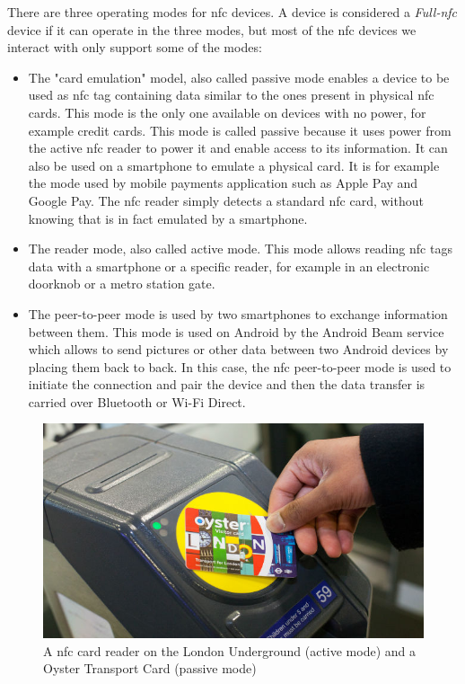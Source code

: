 \documentclass[twoside, openright,11pt,a4paper]{book}
\begin{document}
There are three operating modes for \gls{nfc} devices. A device is considered a \emph{Full-\gls{nfc}} device if it can operate in the three modes, but most of the \gls{nfc} devices we interact with only support some of the modes:
\begin{itemize}
	\item The "card emulation" model, also called passive mode enables a device to be used as \gls{nfc} tag containing data similar to the ones present in physical \gls{nfc} cards. This mode is the only one available on devices with no power, for example credit cards. This mode is called passive because it uses power from the active \gls{nfc} reader to power it and enable access to its information. It can also be used on a smartphone to emulate a physical card. It is for example the mode used by mobile payments application such as Apple Pay and Google Pay. The \gls{nfc} reader simply detects a standard \gls{nfc} card, without knowing that is in fact emulated by a smartphone.
	\item The reader mode, also called active mode. This mode allows reading \gls{nfc} tags data with a smartphone or a specific reader, for example in an electronic doorknob or a metro station gate.
	\item The peer-to-peer mode is used by two smartphones to exchange information between them. This mode is used on Android by the Android Beam service which allows to send pictures or other data between two Android devices by placing them back to back. In this case, the \gls{nfc} peer-to-peer mode is used to initiate the connection and pair the device and then the data transfer is carried over Bluetooth or Wi-Fi Direct.
\end{itemize}
\begin{figure}[H]
\begin{center}
	\includegraphics[width=.6\textwidth]{assets/oyster_reader.jpg}
	\caption[NFC reader and Oyster Card]{A \gls{nfc} card reader on the London Underground (active mode) and a Oyster Transport Card (passive mode) \cite{img:oyster}}
\end{center}
\end{figure}
\end{document}
